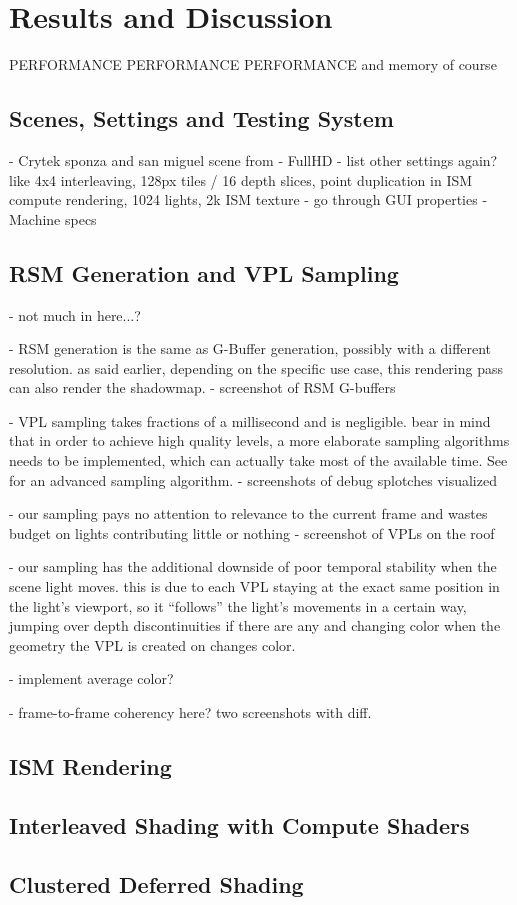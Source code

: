 

\chapter{Results and Discussion}

PERFORMANCE PERFORMANCE PERFORMANCE
and memory of course
\section{Scenes, Settings and Testing System}
- Crytek sponza and san miguel scene from \citep{McGuire2011Data}
- FullHD
- list other settings again? like 4x4 interleaving, 128px tiles / 16 depth slices, point duplication in ISM compute rendering, 1024 lights, 2k ISM texture
    - go through GUI properties
- Machine specs

\section{RSM Generation and VPL Sampling}
- not much in here...?

- RSM generation is the same as G-Buffer generation, possibly with a different resolution. as said earlier, depending on the specific use case, this rendering pass can also render the shadowmap.
- screenshot of RSM G-buffers

- VPL sampling takes fractions of a millisecond and is negligible. bear in mind that in order to achieve high quality levels, a more elaborate sampling algorithms needs to be implemented, which can actually take most of the available time. See \citep{hedman2016sequential} for an advanced sampling algorithm.
- screenshots of debug splotches visualized

- our sampling pays no attention to relevance to the current frame and wastes budget on lights contributing little or nothing
- screenshot of VPLs on the roof

- our sampling has the additional downside of poor temporal stability when the scene light moves. this is due to each VPL staying at the exact same position in the light's viewport, so it ``follows'' the light's movements in a certain way, jumping over depth discontinuities if there are any and changing color when the geometry the VPL is created on changes color.

- implement average color?

- frame-to-frame coherency here? two screenshots with diff.

\section{ISM Rendering}

\section{Interleaved Shading with Compute Shaders}

\section{Clustered Deferred Shading}
